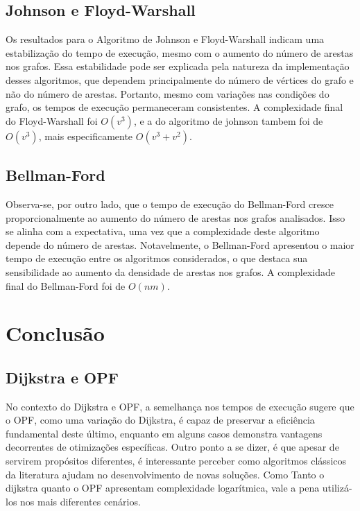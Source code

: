 \documentclass[12pt]{article}
\begin{document}
\subsection{Johnson e Floyd-Warshall}

Os resultados para o Algoritmo de Johnson e Floyd-Warshall indicam uma estabilização do tempo de execução, mesmo com o aumento do número de arestas nos grafos. Essa estabilidade pode ser explicada pela natureza da implementação desses algoritmos, que dependem principalmente do número de vértices do grafo e não do número de arestas. Portanto, mesmo com variações nas condições do grafo, os tempos de execução permaneceram consistentes. A complexidade final do Floyd-Warshall foi $O(v^3)$, e a do algoritmo de johnson tambem foi de $O(v^3)$, mais especificamente $O(v^3 + v^2)$.

\subsection{Bellman-Ford}

Observa-se, por outro lado, que o tempo de execução do Bellman-Ford cresce proporcionalmente ao aumento do número de arestas nos grafos analisados. Isso se alinha com a expectativa, uma vez que a complexidade deste algoritmo depende do número de arestas. Notavelmente, o Bellman-Ford apresentou o maior tempo de execução entre os algoritmos considerados, o que destaca sua sensibilidade ao aumento da densidade de arestas nos grafos. A complexidade final do Bellman-Ford foi de $O(nm)$.

\section{Conclusão}

\subsection{Dijkstra e OPF}
No contexto do Dijkstra e OPF, a semelhança nos tempos de execução sugere que o OPF, como uma variação do Dijkstra, é capaz de preservar a eficiência fundamental deste último, enquanto em alguns casos demonstra vantagens decorrentes de otimizações específicas. Outro ponto a se dizer, é que apesar de servirem propósitos diferentes, é interessante perceber como algoritmos clássicos da literatura ajudam no desenvolvimento de novas soluções. Como Tanto o dijkstra quanto o OPF apresentam complexidade logarítmica, vale a pena utilizá-los nos mais diferentes cenários.
\end{document}
